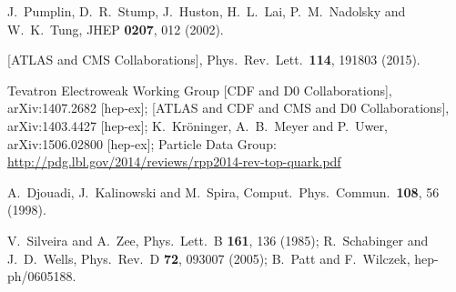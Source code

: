   J.~Pumplin, D.~R.~Stump, J.~Huston, H.~L.~Lai, P.~M.~Nadolsky and W.~K.~Tung,
  JHEP {\bf 0207}, 012 (2002).
  
  [ATLAS and CMS Collaborations],
  Phys.\ Rev.\ Lett.\  {\bf 114}, 191803 (2015).

  Tevatron Electroweak Working Group [CDF and D0 Collaborations],
  arXiv:1407.2682 [hep-ex];
  [ATLAS and CDF and CMS and D0 Collaborations],
  arXiv:1403.4427 [hep-ex];
  K.~Kr\"oninger, A.~B.~Meyer and P.~Uwer,
  arXiv:1506.02800 [hep-ex];
  Particle Data Group:
  \url{http://pdg.lbl.gov/2014/reviews/rpp2014-rev-top-quark.pdf}

  A.~Djouadi, J.~Kalinowski and M.~Spira,
  Comput.\ Phys.\ Commun.\  {\bf 108}, 56 (1998).
  
  V.~Silveira and A.~Zee,
  Phys.\ Lett.\ B {\bf 161}, 136 (1985); 
  R.~Schabinger and J.~D.~Wells,
  Phys.\ Rev.\ D {\bf 72}, 093007 (2005);
  B.~Patt and F.~Wilczek,
  hep-ph/0605188.

